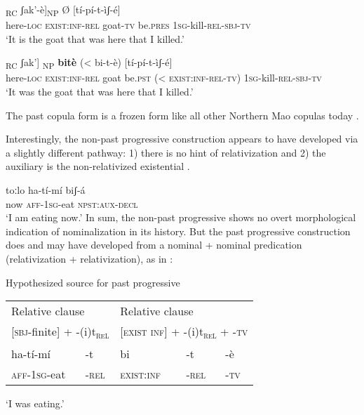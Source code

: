 \documentclass[output=paper]{langsci/langscibook}
\begin{document}
\ea\label{ex:mahland:69}
\gll [[nà-àt       \textbf{bi-t}]\textsubscript{RC}               ʃak'-è]\textsubscript{NP} Ø    [tí-pí-t-ìʃ-é]
\\
{\db}{\db}here-\textsc{loc}    \textsc{exist}:\textsc{inf-rel}    goat-\textsc{tv}    be.\textsc{pres}  {\db}\textsc{1sg}{}-kill-\textsc{rel-sbj-tv}\\
\glt `It is the goat that was here that I killed.'
\z

\ea\label{ex:mahland:70}
\gll [[nà-àt    \textbf{bi-t}]\textsubscript{RC}             ʃak']\textsubscript{ NP}    \textbf{bitè}    ({\textless} bi-t-è)      [tí-pí-t-ìʃ-é]\\
{\db}{\db}here\textsc{{}-loc}   \textsc{exist:inf-rel}   goat    be.\textsc{pst}  ({\textless} \textsc{exist:inf-rel-tv})  {\db}\textsc{1sg}{}-kill-\textsc{rel-sbj-tv}\\
\glt `It was the goat that was here that I killed.'
\z

The past copula form is a frozen form like all other Northern Mao copulas today \citep[465]{Ahland2012}.

Interestingly, the non-past progressive construction appears to have developed via a slightly different pathway: 1) there is no hint of relativization and 2) the auxiliary is the non-relativized existential . 

\ea\label{ex:mahland:71}
\gll toːlo   ha-tí-mí         biʃ-á   \\
now   \textsc{aff-1sg}{}-eat    \textsc{npst:aux-decl} \\
\glt `I am eating now.'
\z
In sum, the non-past progressive shows no overt morphological indication of nominalization in its history. But the past progressive construction does and may have developed from a nominal + nominal predication (relativization + relativization), as in : 

\ea\label{ex:mahland:72}{Hypothesized source for past progressive}\\
\begin{tabular}{lllll}
\multicolumn{2}{l}{Relative clause} & \multicolumn{3}{l}{Relative clause} \\
\multicolumn{2}{l}{[\textsc{sbj-}finite] + -(i)t\textsubscript{\textsc{rel}}} & \multicolumn{3}{l}{[\textsc{exist inf}] + -(i)t\textsubscript{\textsc{rel}} + -\textsc{tv}} \\
ha-tí-mí &  {}-t    &                bi & -t & -è\\
\textsc{aff}-\textsc{1sg}-eat  &  {}-\textsc{rel}  &   \textsc{exist:inf} & \textsc{-rel} & \textsc{-tv} \\
\end{tabular}
\glt `I was eating.'
\z
\end{document}
